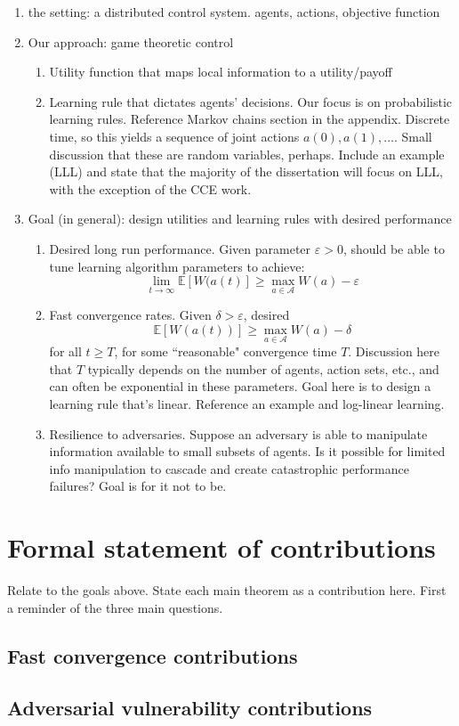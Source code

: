 \begin{enumerate}
    \item the setting: a distributed control system. agents, actions, objective function
    \item Our approach: game theoretic control
    \begin{enumerate}
        \item Utility function that maps local information to a utility/payoff
        \item Learning rule that dictates agents' decisions. Our focus is on probabilistic learning rules. Reference Markov chains section in the appendix. Discrete time, so this yields a sequence of joint actions $a(0),a(1),\ldots.$ Small discussion that these are random variables, perhaps. Include an example (LLL) and state that the majority of the dissertation will focus on LLL, with the exception of the CCE work.
    \end{enumerate}
    \item Goal (in general): design utilities and learning rules with desired performance
    \begin{enumerate}
        \item Desired long run performance. Given parameter $\varepsilon>0$, should be able to tune learning algorithm parameters to achieve:
        $$\lim_{t\to\infty}\mathbb{E}[ W(a(t)]\geq \max_{a\in\mathcal{A}}W(a) - \varepsilon$$
        \item Fast convergence rates. Given $\delta > \varepsilon$, desired
        $$\mathbb{E}[W(a(t))]\geq \max_{a\in\mathcal{A}}W(a) - \delta$$
        for all $t\geq T$, for some ``reasonable" convergence time $T$. Discussion here that $T$ typically depends on the number of agents, action sets, etc., and can often be exponential in these parameters. Goal here is to design a learning rule that's linear. Reference an example and log-linear learning.
        \item Resilience to adversaries. Suppose an adversary is able to manipulate information available to small subsets of agents. Is it possible for limited info manipulation to cascade and create catastrophic performance failures? Goal is for it not to be.
    \end{enumerate}
\end{enumerate}


\section{Formal statement of contributions}

Relate to the goals above. State each main theorem as a contribution here. First a reminder of the three main questions.

\subsection{Fast convergence contributions}

\subsection{Adversarial vulnerability contributions}

